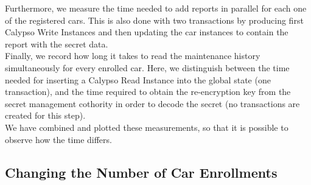 \newline
Furthermore, we measure the time needed to add reports in parallel for each one of the registered cars. This is also done with two transactions by producing first Calypso Write Instances and then updating the car instances to contain the report with the secret data.\\
\newline
Finally, we record how long it takes to read the maintenance history simultaneously for every enrolled car. Here, we distinguish between the time needed for inserting a Calypso Read Instance into the global state (one transaction), and the time required to obtain the re-encryption key from the secret management cothority in order to decode the secret (no transactions are created for this step).\\
\newline
We have combined and plotted these measurements, so that it is possible to observe how the time differs.


\subsection{Changing the Number of Car Enrollments}

